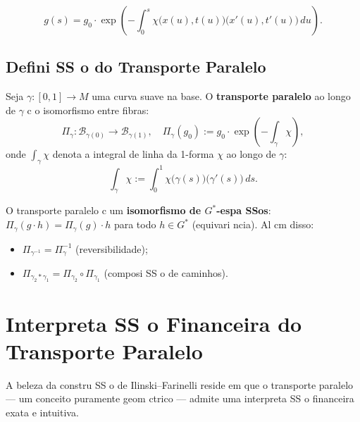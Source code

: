{\begin{equation}\label{eq:parallel_transport_solution}
 g(s) = g_0 \cdot \exp\left(-\int_0^s
 \chi\big(x(u), t(u)\big)\big(x'(u), t'(u)\big)\,du\right).
\end{equation}

\subsection{Defini SS o do Transporte Paralelo}

\begin{defi}\label{def:parallel_transport}
Seja $\gamma: [0,1] \to M$ uma curva suave na base. O
\textbf{transporte paralelo} ao longo de $\gamma$ c o isomorfismo
entre fibras:
\begin{equation}\label{eq:parallel_transport_map}
 \Pi_\gamma: \mathcal{B}_{\gamma(0)} \to \mathcal{B}_{\gamma(1)},
 \quad
 \Pi_\gamma(g_0) := g_0 \cdot \exp\left(-\int_\gamma \chi\right),
\end{equation}
onde $\int_\gamma \chi$ denota a integral de linha da 1-forma $\chi$
ao longo de $\gamma$:
\begin{equation}\label{eq:line_integral_chi}
 \int_\gamma \chi := \int_0^1
 \chi\big(\gamma(s)\big)\big(\gamma'(s)\big)\,ds.
\end{equation}
\end{defi}

\begin{obs}
O transporte paralelo c um \textbf{isomorfismo de $G^*$-espa SSos}:
$\Pi_\gamma(g \cdot h) = \Pi_\gamma(g) \cdot h$ para todo $h \in
G^*$ (equivari ncia). Al cm disso:
\begin{itemize}
 \item $\Pi_{\gamma^{-1}} = \Pi_\gamma^{-1}$ (reversibilidade);
 \item $\Pi_{\gamma_2 \ast \gamma_1} = \Pi_{\gamma_2} \circ
 \Pi_{\gamma_1}$ (composi SS o de caminhos).
\end{itemize}
\end{obs}

\section{Interpreta SS o Financeira do Transporte Paralelo}

A beleza da constru SS o de Ilinski--Farinelli reside em que o transporte
paralelo --- um conceito puramente geom ctrico --- admite uma
interpreta SS o financeira exata e intuitiva.

}

